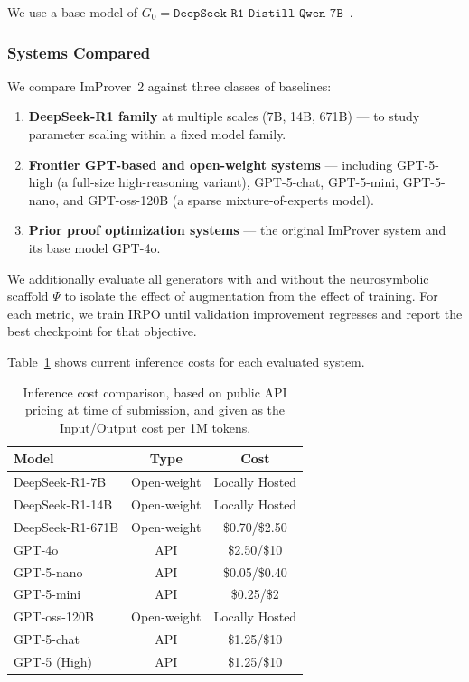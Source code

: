 We use a base model of $G_0 = \texttt{DeepSeek-R1-Distill-Qwen-7B}$~\cite{DeepseekR1}.

\subsubsection{Systems Compared}

We compare ImProver~2 against three classes of baselines:

\begin{enumerate}
    \item \textbf{DeepSeek-R1 family} at multiple scales (7B, 14B, 671B) --- to study parameter scaling within a fixed model family.
    \item \textbf{Frontier GPT-based and open-weight systems} --- including GPT-5-high (a full-size high-reasoning variant), GPT-5-chat, GPT-5-mini, GPT-5-nano, and GPT-oss-120B (a sparse mixture-of-experts model).
    \item \textbf{Prior proof optimization systems} --- the original ImProver system and its base model GPT-4o.
\end{enumerate}

We additionally evaluate all generators with and without the neurosymbolic scaffold $\Psi$ to isolate the effect of augmentation from the effect of training. For each metric, we train IRPO until validation improvement regresses and report the best checkpoint for that objective.

Table~\ref{tab:cost} shows current inference costs for each evaluated system.

\begin{table}[ht]
\centering
\caption{Inference cost comparison, based on public API pricing at time of submission, and given as the Input/Output cost per 1M tokens.}
\label{tab:cost}
\small
\begin{tabular}{lcc}
\toprule
\textbf{Model} & \textbf{Type} & \textbf{Cost}\\
\midrule
DeepSeek-R1-7B   & Open-weight & Locally Hosted \\
DeepSeek-R1-14B  & Open-weight & Locally Hosted \\
DeepSeek-R1-671B & Open-weight & \$0.70/\$2.50 \\
GPT-4o           & API         & \$2.50/\$10 \\
GPT-5-nano       & API         & \$0.05/\$0.40 \\
GPT-5-mini       & API         & \$0.25/\$2 \\
GPT-oss-120B     & Open-weight & Locally Hosted \\
GPT-5-chat       & API         & \$1.25/\$10 \\
GPT-5 (High)     & API         & \$1.25/\$10 \\
\bottomrule
\end{tabular}
\end{table}


